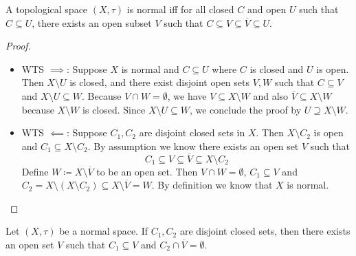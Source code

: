\documentclass[screen]{techreport}
\numberwithin{equation}{section}
\begin{document}
\begin{lemma}\label{Lem:NormalIffNeighborContainClosure}
	A topological space $(X,\tau)$ is normal iff for all closed $C$ and open $U$ such that $C \subseteq U$, there exists an open subset $V$ such that $C \subseteq V \subseteq \overline{V} \subseteq U$.
\end{lemma}
\begin{proof}\
	\begin{itemize}
		\item WTS $\implies$: Suppose $X$ is normal and $C \subseteq U$ where $C$ is closed and $U$ is open.
		Then $X \setminus U$ is closed, and there exist disjoint open sets $V,W$ such that $C \subseteq V$ and $X \setminus U \subseteq W$.
		Because $V \cap W = \emptyset$, we have $V \subseteq X \setminus W$ and also $\overline{V} \subseteq X \setminus W$ because $X \setminus W$ is closed.
		Since $X \setminus U \subseteq W$, we conclude the proof by $U \supseteq X \setminus W$.
		\item WTS $\impliedby$: Suppose $C_1,C_2$ are disjoint closed sets in $X$.
		Then $X \setminus C_2$ is open and $C_1 \subseteq X \setminus C_2$.
		By assumption we know there exists an open set $V$ such that
		\[
		C_1 \subseteq V \subseteq \overline{V} \subseteq X \setminus C_2
		\]
		Define $W \coloneqq X \setminus \overline{V}$ to be an open set.
		Then $V \cap W = \emptyset$, $C_1 \subseteq V$ and $C_2 = X \setminus (X \setminus C_2) \subseteq X \setminus \overline{V} = W$.
		By definition we know that $X$ is normal.
	\end{itemize}
\end{proof}

\begin{corollary}\label{Cor:NormalIffNeighborContainClosure}
	Let $(X,\tau)$ be a normal space.
	If $C_1,C_2$ are disjoint closed sets, then there exists an open set $V$ such that $C_1 \subseteq V$ and $C_2 \cap \overline{V} =\emptyset$.
\end{corollary}
\end{document}
